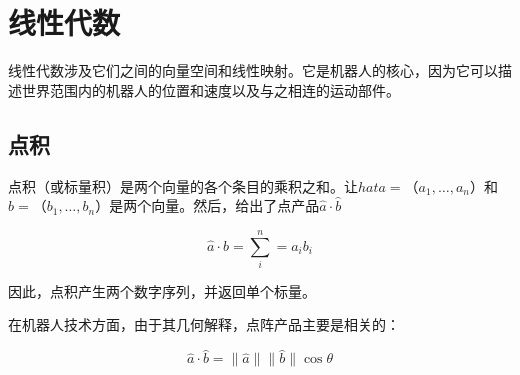 
\chapter{线性代数}
线性代数涉及它们之间的向量空间和线性映射。它是机器人的核心，因为它可以描述世界范围内的机器人的位置和速度以及与之相连的运动部件。


\section{点积}
点积（或标量积）是两个向量的各个条目的乘积之和。让$hat{a}=（a_1,\ldots,a_n）$和$\hat{b}=（b_1,\ldots,b_n）$是两个向量。然后，给出了点产品$\hat{a}\cdot\hat{b}$

\begin{equation}
\hat{a}\cdot\hat{b}=\sum_{i}^n=a_ib_i
\end{equation}



因此，点积产生两个数字序列，并返回单个标量。

在机器人技术方面，由于其几何解释，点阵产品主要是相关的：

\begin{equation}
\hat{a}\cdot\hat{b}=\|\hat{a}\|\|\hat{b}\|\cos\theta
\end{equation}


